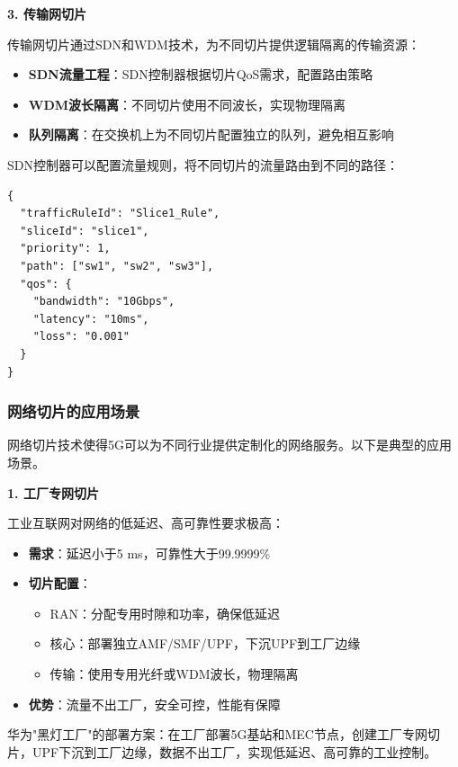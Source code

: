 \textbf{3. 传输网切片}

传输网切片通过SDN和WDM技术，为不同切片提供逻辑隔离的传输资源：

\begin{itemize}
    \item \textbf{SDN流量工程}：SDN控制器根据切片QoS需求，配置路由策略
    \item \textbf{WDM波长隔离}：不同切片使用不同波长，实现物理隔离
    \item \textbf{队列隔离}：在交换机上为不同切片配置独立的队列，避免相互影响
\end{itemize}

SDN控制器可以配置流量规则，将不同切片的流量路由到不同的路径：

\begin{verbatim}
{
  "trafficRuleId": "Slice1_Rule",
  "sliceId": "slice1",
  "priority": 1,
  "path": ["sw1", "sw2", "sw3"],
  "qos": {
    "bandwidth": "10Gbps",
    "latency": "10ms",
    "loss": "0.001"
  }
}
\end{verbatim}

\subsubsection{网络切片的应用场景}

网络切片技术使得5G可以为不同行业提供定制化的网络服务。以下是典型的应用场景。

\textbf{1. 工厂专网切片}

工业互联网对网络的低延迟、高可靠性要求极高：

\begin{itemize}
    \item \textbf{需求}：延迟小于5 ms，可靠性大于99.9999\%
    \item \textbf{切片配置}：
    \begin{itemize}
        \item RAN：分配专用时隙和功率，确保低延迟
        \item 核心：部署独立AMF/SMF/UPF，下沉UPF到工厂边缘
        \item 传输：使用专用光纤或WDM波长，物理隔离
    \end{itemize}
    \item \textbf{优势}：流量不出工厂，安全可控，性能有保障
\end{itemize}

华为"黑灯工厂"的部署方案：在工厂部署5G基站和MEC节点，创建工厂专网切片，UPF下沉到工厂边缘，数据不出工厂，实现低延迟、高可靠的工业控制。

